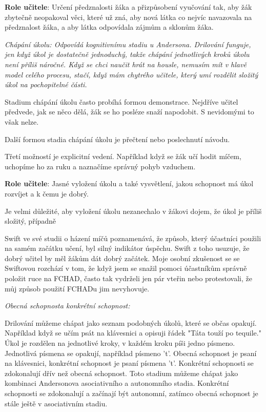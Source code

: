 {\bf Role učitele}: Určení předznalosti žáka a přizpůsobení vyučování tak, aby žák zbytečně neopakoval věci, které už zná, aby nová látka co nejvíc navazovala na předznalost žáka, a aby látka odpovídala zájmům a sklonům žáka.

\em Chápání úkolu\em : Odpovídá kognitivnímu stadiu u Andersona. Drilování funguje, jen když úkol je dostatečně jednoduchý, takže chápání jednotlivých kroků úkolu není příliš náročné.  Když se chci naučit hrát na housle, nemusím mít v hlavě model celého procesu, stačí, když mám chytrého učitele, který umí rozdělit složitý úkol na pochopitelné části.

Stadium chápání úkolu často probíhá formou demonstrace.  Nejdříve učitel předvede, jak se něco dělá, žák se ho posléze snaží napodobit.  S nevidomými to však nelze.

Další formou stadia chápání úkolu je přečtení nebo poslechnutí návodu.

Třetí možností je explicitní vedení.  Například když se žák učí hodit míčem, uchopíme ho za ruku a naznačíme správný pohyb vzduchem.

{\bf Role učitele}: Jasné vyložení úkolu a také vysvětlení, jakou schopnost má úkol rozvíjet a k čemu je dobrý.

Je velmi důležité, aby vyložení úkolu nezanechalo v žákovi dojem, že úkol je příliš složitý, případně 

Swift ve své studii o házení míčů poznamenává, že způsob, který účastníci použili na samém začátku učení, byl silný indikátor úspěchu. Swift z toho usuzuje, že dobrý učitel by měl žákům dát dobrý začátek.  \citep[str. 215]{swift1903studies}  Moje osobní zkušenost se se Swiftovou rozchází v tom, že když jsem se snažil pomoci účastníkům správně položit ruce na FCHAD, často tak vydrželi jen pár vteřin nebo protestovali, že můj způsob použití FCHADu jim nevyhovuje.

\em Obecná schopnost\em  a \em konkrétní schopnost\em :

Drilování můžeme chápat jako seznam podobných úkolů, které se občas opakují.  Například když se učím psát na klávesnici a opisuji řádek "Táta touží po tequile." Úkol je rozdělen na jednotlivé kroky, v každém kroku píši jedno písmeno.  Jednotlivá písmena se opakují, například písmeno 't'.  Obecná schopnost je psaní na klávesnici, konkrétní schopnost je psaní písmena 't'. Konkrétní schopnosti se zdokonalují dřív než obecná schopnost.  Toto stadium můžeme chápat jako kombinaci Andersonova asociativního a autonomního stadia.  Konkrétní schopnosti se zdokonalují a začínají být autonomní, zatímco obecná schopnost je stále ještě v asociativním stadiu.

